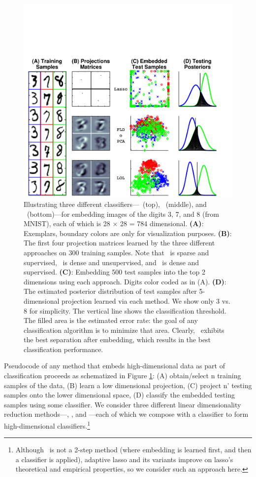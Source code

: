 \documentclass[10pt]{article}
\begin{document}
\begin{figure}
\centering %
\includegraphics[width=0.5\linewidth,trim=0cm 0cm 1cm 4.4cm,clip=true]{../Figs/mnist.pdf}
\caption{
Illustrating three different classifiers---~(top), ~(middle), and \Lol~(bottom)---for embedding images of the digits 3, 7, and 8 (from MNIST), each of which is 28 $\times$ 28 = 784 dimensional.  
\textbf{(A)}: Exemplars, boundary colors are only for visualization purposes.
\textbf{(B)}: The first four projection matrices learned by the three different approaches on 300 training samples. Note that ~is sparse and supervised, \Pca~is dense and unsupervised, and \Lol~is dense and supervised.
\textbf{(C)}: Embedding 500 test samples into the top 2 dimensions using each approach.  Digits color coded as in (A).
\textbf{(D)}:  The estimated posterior distribution of test samples after 
5-dimensional projection learned via each method.  
We show only 3 vs. 8 for simplicity.
The vertical line shows the classification threshold.
The filled area is the estimated error rate: the goal of any classification algorithm is to minimize that area. 
Clearly, \Lol~exhibits the best separation after embedding, which results in the best classification performance.
}
\label{fig:mnist}
\end{figure}

Pseudocode of any method that embeds high-dimensional data as part of classification proceeds as schematized in Figure \ref{fig:mnist}: 
(A) obtain/select n training samples of the data, 
(B) learn a low dimensional projection, 
(C) project n' testing samples onto the lower dimensional space, 
(D) classify the embedded testing samples using some classifier.  
We consider  three different linear dimensionality reduction methods---, \Pca, and \Lol---each of which we compose with a classifier to form high-dimensional classifiers.\footnote{Although ~is not a 2-step method (where embedding is learned first, and then a classifier is applied), adaptive lasso \cite{Zou2006a} and its variants improve on lasso's theoretical and empirical properties, so we consider such an approach here.}
\end{document}
